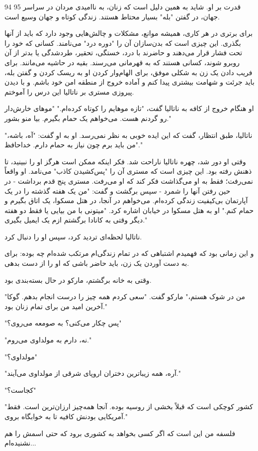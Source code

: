 94 95 قدرت بر او. شاید به همین دلیل است که زنان، به ناامیدی مردان در سراسر جهان، در گفتن "بله" بسیار محتاط هستند. زندگی کوتاه و جهان وسیع است.

برای برتری در هر کاری، همیشه موانع، مشکلات و چالش‌هایی وجود دارد که باید از آنها بگذری. این چیزی است که بدن‌سازان آن را "دوره درد" می‌نامند. کسانی که خود را تحت فشار قرار می‌دهند و حاضرند با درد، خستگی، تحقیر، طردشدگی یا بدتر از آن روبرو شوند، کسانی هستند که به قهرمانی می‌رسند. بقیه در حاشیه می‌مانند. برای فریب دادن یک زن به شکلی موفق، برای الهام‌وار کردن او به ریسک کردن و گفتن بله، باید جرئت و شهامت بیشتری پیدا کنم و آماده خروج از منطقه امن خود باشم. و با دیدن پیروزی مستری بر ناتالیا این درس را آموختم.

او هنگام خروج از کافه به ناتالیا گفت، "تازه موهایم را کوتاه کرده‌ام." "موهای خارش‌دار رو گردنم هست. می‌خواهم یک حمام بگیرم. بیا منو بشور."

ناتالیا، طبق انتظار، گفت که این ایده خوبی به نظر نمی‌رسد. او به او گفت: "آه، باشه،" "من باید برم چون نیاز به حمام دارم. خداحافظ."

وقتی او دور شد، چهره ناتالیا ناراحت شد. فکر اینکه ممکن است هرگز او را نبینید، تا ذهنش رفته بود. این چیزی است که مستری آن را "پس‌کشیدن کاذب" می‌نامد. او واقعاً نمی‌رفت؛ فقط به او می‌گذاشت فکر کند که او می‌رفت. مستری پنج قدم برداشت - در حین رفتن آنها را شمرد - سپس برگشت و گفت: "من یک هفته گذشته را در یک آپارتمان بی‌کیفیت زندگی کرده‌ام. می‌خواهم در آنجا، در هتل مسکوا، یک اتاق بگیرم و حمام کنم." او به هتل مسکوا در خیابان اشاره کرد. "میتونی با من بیایی یا فقط دو هفته دیگر وقتی به کانادا برگشتم ازم یک ایمیل بگیری."

ناتالیا لحظه‌ای تردید کرد، سپس او را دنبال کرد.

و این زمانی بود که فهمیدم اشتباهی که در تمام زندگی‌ام مرتکب شده‌ام چه بوده: برای به دست آوردن یک زن، باید حاضر باشی که او را از دست بدهی.

وقتی به خانه برگشتم، مارکو در حال بسته‌بندی بود.

"من در شوک هستم،" مارکو گفت. "سعی کردم همه چیز را درست انجام بدهم. گوکا آخرین امید من برای تمام زنان بود."

"پس چکار می‌کنی؟ به صومعه می‌روی؟"

"نه، دارم به مولداوی می‌روم."

"مولداوی؟"

"آره، همه زیباترین دختران اروپای شرقی از مولداوی می‌آیند."

"کجاست؟"

"کشور کوچکی است که قبلاً بخشی از روسیه بوده. آنجا همه‌چیز ارزان‌ترین است. فقط آمریکایی بودنش کافیه تا به خوابگاه بروی."

فلسفه من این است که اگر کسی بخواهد به کشوری برود که حتی اسمش را هم نشنیده‌ام...